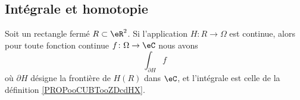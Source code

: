 \subsection{Intégrale et homotopie}

\begin{lemma}       \label{LEMooOFCEooIsuchR}
    Soit un rectangle fermé \( R\subset \eR^2\). Si l'application \( H\colon R\to \Omega\) est continue, alors pour toute fonction continue \( f\colon \Omega\to \eC\) nous avons
    \begin{equation}
        \int_{\partial H}f
    \end{equation}
    où \( \partial H\) désigne la frontière de \( H(R)\) dans \( \eC\), et l'intégrale est celle de la définition \ref{PROPooCUBTooZDcdHX}.
\end{lemma}

